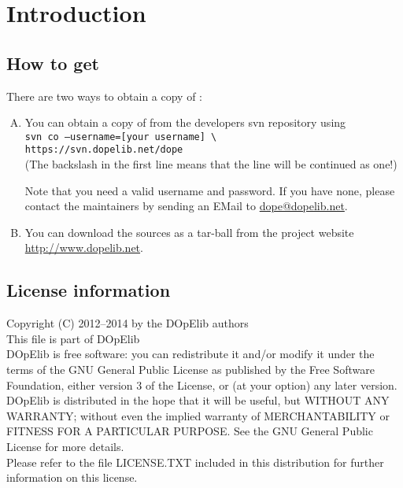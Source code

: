 \chapter{Introduction}\label{chap:intro}
\section{How to get \dope{}}\label{sec:obtain}
There are two ways to obtain a copy of \dope{}:\\

\begin{enumerate}[A)]
\item You can obtain a copy of \dope{} from the developers svn repository using\\
\texttt{svn co --username=[your username] \textbackslash \\ 
\hspace*{5mm}https://svn.dopelib.net/dope}\\
(The backslash in the first line means that the line will be continued as one!)

Note that you need a valid username and password. If you have none, please contact the 
maintainers by sending an EMail to \url{dope@dopelib.net}.
%
\item You can download the sources as a tar-ball from the project website\\ 
\url{http://www.dopelib.net}.
\end{enumerate}


\section{License information}
Copyright (C) 2012--2014 by the DOpElib authors\\[2mm]
%
This file is part of DOpElib\\[2mm]
%
DOpElib is free software: you can redistribute it
and/or modify it under the terms of the GNU General Public
License as published by the Free Software Foundation, either
version 3 of the License, or (at your option) any later
version.\\[2mm]
%
DOpElib is distributed in the hope that it will be
useful, but WITHOUT ANY WARRANTY; without even the implied
warranty of MERCHANTABILITY or FITNESS FOR A PARTICULAR
PURPOSE.  See the GNU General Public License for more
details.\\[2mm]
%
Please refer to the file LICENSE.TXT included in this distribution
for further information on this license.


